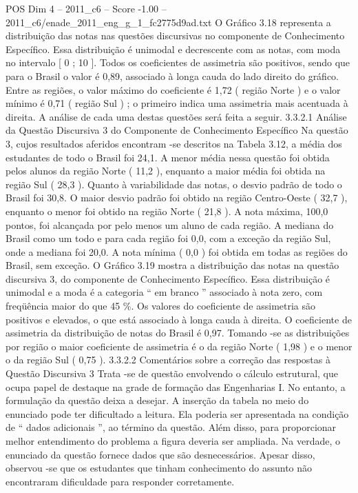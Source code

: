\begin{textsample}{POS Dim 4 – 2011\_c6 – Score -1.00 – 2011\_c6/enade\_2011\_eng\_g\_1\_fc2775d9ad.txt}
O Gráfico 3.18 representa a distribuição das notas nas questões discursivas no componente de Conhecimento Específico.
Essa distribuição é unimodal e decrescente com as notas, com moda no intervalo [ 0 ; 10 ].
Todos os coeficientes de assimetria são positivos, sendo que para o Brasil o valor é 0,89, associado à longa cauda do lado direito do gráfico.
Entre as regiões, o valor máximo do coeficiente é 1,72 ( região Norte ) e o valor mínimo é 0,71 ( região Sul ) ; o primeiro indica uma assimetria mais acentuada à direita.
A análise de cada uma destas questões será feita a seguir. 3.3.2.1 Análise da Questão Discursiva 3 do Componente de Conhecimento Específico Na questão 3, cujos resultados aferidos encontram -se descritos na Tabela 3.12, a média dos estudantes de todo o Brasil foi 24,1.
A menor média nessa questão foi obtida pelos alunos da região Norte ( 11,2 ), enquanto a maior média foi obtida na região Sul ( 28,3 ).
Quanto à variabilidade das notas, o desvio padrão de todo o Brasil foi 30,8.
O maior desvio padrão foi obtido na região Centro-Oeste ( 32,7 ), enquanto o menor foi obtido na região Norte ( 21,8 ).
A nota máxima, 100,0 pontos, foi alcançada por pelo menos um aluno de cada região.
A mediana do Brasil como um todo e para cada região foi 0,0, com a exceção da região Sul, onde a mediana foi 20,0.
A nota mínima ( 0,0 ) foi obtida em todas as regiões do Brasil, sem exceção.
O Gráfico 3.19 mostra a distribuição das notas na questão discursiva 3, do componente de Conhecimento Específico.
Essa distribuição é unimodal e a moda é a categoria “ em branco ” associado à nota zero, com freqüência maior do que 45 \%.
Os valores do coeficiente de assimetria são positivos e elevados, o que está associado à longa cauda à direita.
O coeficiente de assimetria da distribuição de notas do Brasil é 0,97.
Tomando -se as distribuições por região o maior coeficiente de assimetria é o da região Norte ( 1,98 ) e o menor o da região Sul ( 0,75 ). 3.3.2.2 Comentários sobre a correção das respostas à Questão Discursiva 3 Trata -se de questão envolvendo o cálculo estrutural, que ocupa papel de destaque na grade de formação das Engenharias I.
No entanto, a formulação da questão deixa a desejar.
A inserção da tabela no meio do enunciado pode ter dificultado a leitura.
Ela poderia ser apresentada na condição de “ dados adicionais ”, ao término da questão.
Além disso, para proporcionar melhor entendimento do problema a figura deveria ser ampliada.
Na verdade, o enunciado da questão fornece dados que são desnecessários.
Apesar disso, observou -se que os estudantes que tinham conhecimento do assunto não encontraram dificuldade para responder corretamente.

\end{textsample}
